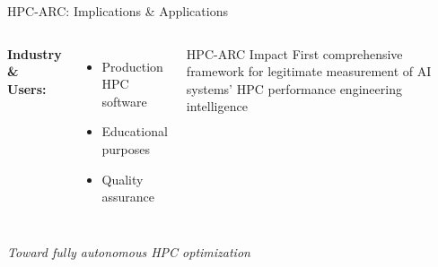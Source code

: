 \documentclass[compress,aspectratio=169]{beamer}
\begin{document}
\begin{frame}{HPC-ARC: Implications \& Applications}
\begin{columns}[t]
            \vspace{0.5em}
            \textbf{Industry \& Users:}
            \begin{itemize}
                \item Production HPC software
                \item Educational purposes
                \item Quality assurance
            \end{itemize}

            \vspace{0.8em}
            \begin{block}{HPC-ARC Impact}
                \scriptsize
                First comprehensive framework for legitimate measurement of AI systems' HPC performance engineering intelligence
            \end{block}
    \end{columns}

    \vspace{0.1em}
    \begin{center}
      \tiny \textit{Toward fully autonomous HPC optimization}
    \end{center}
\end{frame}
\end{document}
